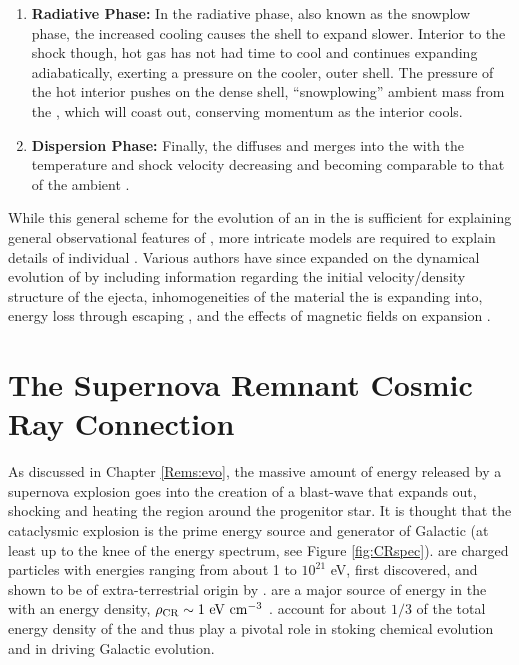\begin{enumerate}
	\item \textbf{Radiative Phase:} In the radiative phase, also known as the snowplow phase, the increased cooling causes the \snr{} shell to expand slower. Interior to the shock though, hot gas has not had time to cool and continues expanding adiabatically, exerting a pressure on the cooler, outer shell. The pressure of the hot interior pushes on the dense shell,  ``snowplowing'' ambient mass from the \ism{}, which will coast out, conserving momentum as the interior cools. 
	\item \textbf{Dispersion Phase:} Finally, the \snr{} diffuses and merges into the \ism{} with the temperature and shock velocity decreasing and becoming comparable to that of the ambient \ism{}.
\end{enumerate}

While this general scheme for the evolution of an \snr{} in the \ism{} is sufficient for explaining general observational features of \snrs{}, more intricate models are required to explain details of individual \snrs{}. Various authors have since expanded on the dynamical evolution of \snrs{} by including information regarding the initial velocity/density structure of the ejecta, inhomogeneities of the material the \snr{} is expanding into, energy loss through escaping \crs{}, and the effects of magnetic fields on expansion \citep[and references in \cite{Vink12} which reviews various analytic ]{Chevalier74,Chevalier82,Truelove99}.
  
\section{\label{Rems:CR}The Supernova Remnant Cosmic Ray Connection}

As discussed in Chapter \ref{Rems:evo}, the massive amount of energy released by a supernova explosion goes into the creation of a blast-wave that expands out, shocking and heating the region around the progenitor star. It is thought that the cataclysmic explosion is the prime energy source and generator of Galactic \crs{} (at least up to the knee of the \cray{} energy spectrum, see Figure \ref{fig:CRspec}).  \crs{} are charged particles with energies ranging from about 1\mev{} to $10^{21}$ eV, first discovered, and shown to be of extra-terrestrial origin by \cite{Hess12}. \crs{} are a major source of energy in the \ism{} with an energy density,  ${\rm \rho_{CR} \sim 1~eV~cm^{-3}}$ \citep{Blasi13,Horandel08}. \crs{} account for about $1/3$ of the total energy density of the \ism{} and thus play a pivotal role in stoking chemical evolution and in  driving Galactic evolution. 

